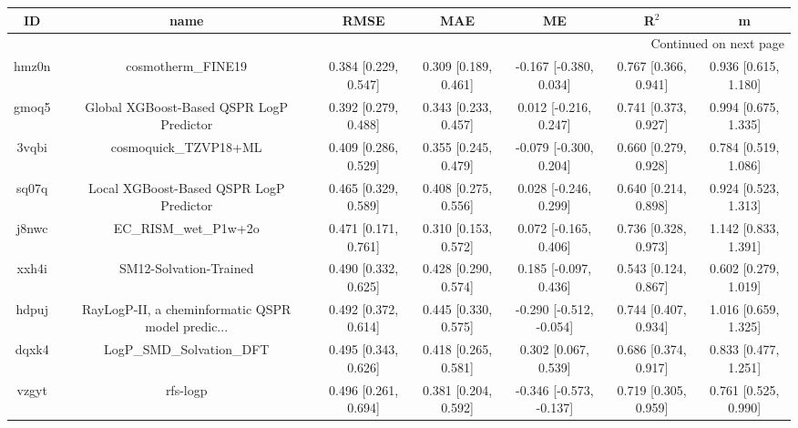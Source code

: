 \documentclass{article}
\begin{document}
\begin{center}
\begin{longtable}{|ccccccc|}
\toprule
    ID &                                               name &                  RMSE &                   MAE &                       ME &                 R$^2$ &                       m \\
\midrule
\endhead
\midrule
\multicolumn{7}{r}{{Continued on next page}} \\
\midrule
\endfoot

\bottomrule
\endlastfoot
 hmz0n &                                 cosmotherm\_FINE19 &  0.384 [0.229, 0.547] &  0.309 [0.189, 0.461] &   -0.167 [-0.380, 0.034] &  0.767 [0.366, 0.941] &    0.936 [0.615, 1.180] \\
 gmoq5 &           Global XGBoost-Based QSPR LogP Predictor &  0.392 [0.279, 0.488] &  0.343 [0.233, 0.457] &    0.012 [-0.216, 0.247] &  0.741 [0.373, 0.927] &    0.994 [0.675, 1.335] \\
 3vqbi &                              cosmoquick\_TZVP18+ML &  0.409 [0.286, 0.529] &  0.355 [0.245, 0.479] &   -0.079 [-0.300, 0.204] &  0.660 [0.279, 0.928] &    0.784 [0.519, 1.086] \\
 sq07q &            Local XGBoost-Based QSPR LogP Predictor &  0.465 [0.329, 0.589] &  0.408 [0.275, 0.556] &    0.028 [-0.246, 0.299] &  0.640 [0.214, 0.898] &    0.924 [0.523, 1.313] \\
 j8nwc &                              EC\_RISM\_wet\_P1w+2o &  0.471 [0.171, 0.761] &  0.310 [0.153, 0.572] &    0.072 [-0.165, 0.406] &  0.736 [0.328, 0.973] &    1.142 [0.833, 1.391] \\
 xxh4i &                             SM12-Solvation-Trained &  0.490 [0.332, 0.625] &  0.428 [0.290, 0.574] &    0.185 [-0.097, 0.436] &  0.543 [0.124, 0.867] &    0.602 [0.279, 1.019] \\
 hdpuj &  RayLogP-II, a cheminformatic QSPR model predic... &  0.492 [0.372, 0.614] &  0.445 [0.330, 0.575] &  -0.290 [-0.512, -0.054] &  0.744 [0.407, 0.934] &    1.016 [0.659, 1.325] \\
 dqxk4 &                          LogP\_SMD\_Solvation\_DFT &  0.495 [0.343, 0.626] &  0.418 [0.265, 0.581] &     0.302 [0.067, 0.539] &  0.686 [0.374, 0.917] &    0.833 [0.477, 1.251] \\
 vzgyt &                                           rfs-logp &  0.496 [0.261, 0.694] &  0.381 [0.204, 0.592] &  -0.346 [-0.573, -0.137] &  0.719 [0.305, 0.959] &    0.761 [0.525, 0.990] \\

\end{longtable}
\end{center}
\end{document}

